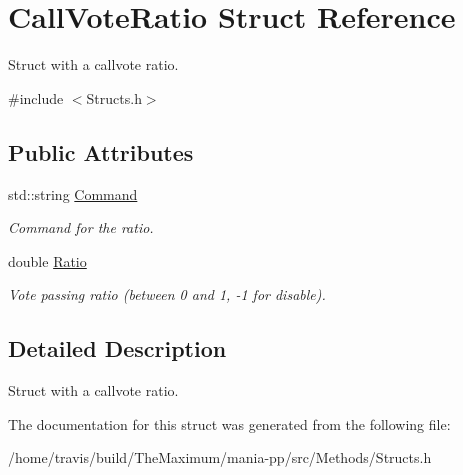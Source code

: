 \hypertarget{structCallVoteRatio}{\section{Call\-Vote\-Ratio Struct Reference}
\label{structCallVoteRatio}
}


Struct with a callvote ratio.  




{\ttfamily \#include $<$Structs.\-h$>$}

\subsection*{Public Attributes}
\begin{DoxyCompactItemize}
\item 
\hypertarget{structCallVoteRatio_a14e3195672c370c5c85ad06287c1d509}{std\-::string \hyperlink{structCallVoteRatio_a14e3195672c370c5c85ad06287c1d509}{Command}}\label{structCallVoteRatio_a14e3195672c370c5c85ad06287c1d509}

\begin{DoxyCompactList}\small\item\em Command for the ratio. \end{DoxyCompactList}\item 
\hypertarget{structCallVoteRatio_a117baff727c0bbd5860cd4ed4998ec85}{double \hyperlink{structCallVoteRatio_a117baff727c0bbd5860cd4ed4998ec85}{Ratio}}\label{structCallVoteRatio_a117baff727c0bbd5860cd4ed4998ec85}

\begin{DoxyCompactList}\small\item\em Vote passing ratio (between 0 and 1, -\/1 for disable). \end{DoxyCompactList}\end{DoxyCompactItemize}


\subsection{Detailed Description}
Struct with a callvote ratio. 

The documentation for this struct was generated from the following file\-:\begin{DoxyCompactItemize}
\item 
/home/travis/build/\-The\-Maximum/mania-\/pp/src/\-Methods/Structs.\-h\end{DoxyCompactItemize}

